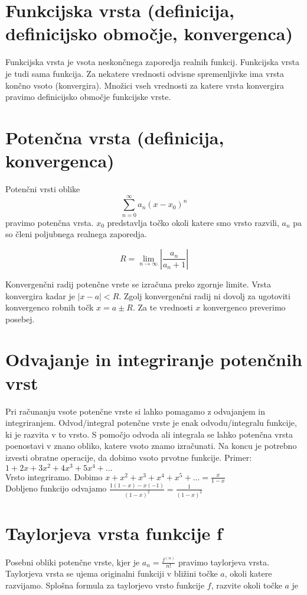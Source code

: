 \documentclass[12pt]{report}
\begin{document}
\section*{Funkcijska vrsta (definicija, definicijsko območje, konvergenca)}

Funkcijska vrsta je vsota neskončnega zaporedja realnih funkcij. Funkcijska vrsta je tudi sama funkcija. Za nekatere vrednosti odvisne spremenljivke ima vrsta končno vsoto (konvergira). Množici vseh vrednosti za katere vrsta konvergira pravimo definicijsko območje funkcijske vrste.


\section*{Potenčna vrsta (definicija, konvergenca)}

Potenčni vrsti oblike $$ \sum_{n=0}^{\infty} a_n(x-x_0)^n$$ pravimo potenčna vrsta. $x_0$ predstavlja točko okoli katere smo vrsto razvili, $a_n$ pa so členi poljubnega realnega zaporedja.

\[
R = \lim_{n\rightarrow\infty} \left| \frac{a_n}{a_n+1} \right| 
\]


Konvergenčni radij potenčne vrste se izračuna preko zgornje limite. Vrsta konvergira kadar je $|x-a|<R$. Zgolj konvergenčni radij ni dovolj za ugotoviti konvergenco robnih točk $x=a \pm R$. Za te vrednosti $x$ konvergenco preverimo posebej.



\section*{Odvajanje in integriranje potenčnih vrst}

Pri računanju vsote potenčne vrste si lahko pomagamo z odvajanjem in integriranjem. Odvod/integral potenčne vrste je enak odvodu/integralu funkcije, ki je razvita v to vrsto. S pomočjo odvoda ali integrala se lahko potenčna vrsta poenostavi v znano obliko, katere vsoto znamo izračunati. Na koncu je potrebno izvesti obratne operacije, da dobimo vsoto prvotne funkcije.
\bigbreak
Primer: $1+2x+3x^2+4x^3+5x^4+ ...$ \\
Vrsto integriramo. Dobimo $x+x^2+x^3+x^4+x^5 +... =\frac{x}{1-x}$ \\
Dobljeno funkcijo odvajamo $\frac{1(1-x)-x(-1)} {(1-x)^2}=\frac{1}{(1-x)^2}$


\section*{Taylorjeva vrsta funkcije f}
Posebni obliki potenčne vrste, kjer je $a_n = \frac{f^{(n)}}{n!}$ pravimo taylorjeva vrsta. Taylorjeva vrsta se ujema originalni funkciji v bližini točke $a$, okoli katere razvijamo. Splošna formula za taylorjevo vrsto funkcije $f$, razvite okoli točke $a$ je
\end{document}
